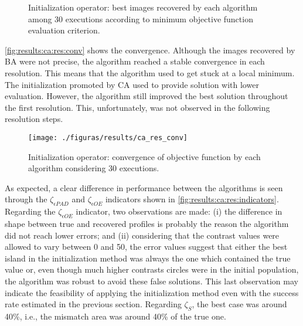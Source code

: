 			\begin{figure}
				\centering
				\caption[Initialization operator: best images recovered by each algorithm.]{Initialization operator: best images recovered by each algorithm among 30 executions according to minimum objective function evaluation criterion.}
				\label{fig:results:ca:res:images}
			\end{figure}
		
			\autoref{fig:results:ca:res:conv} shows the convergence. Although the images recovered by BA were not precise, the algorithm reached a stable convergence in each resolution. This means that the algorithm used to get stuck at a local minimum. The initialization promoted by CA used to provide solution with lower evaluation. However, the algorithm still improved the best solution throughout the first resolution. This, unfortunately, was not observed in the following resolution steps.
		
			\begin{figure}
				\centering
				\texttt{[image: ./figuras/results/ca\_res\_conv]}
				\caption[Initialization operator: convergence.]{Initialization operator: convergence of objective function by each algorithm considering 30 executions.}
				\label{fig:results:ca:res:conv}
			\end{figure}
		
			As expected, a clear difference in performance between the algorithms is seen through the $\zeta_{\epsilon PAD}$ and $\zeta_{\epsilon OE}$ indicators shown in \autoref{fig:results:ca:res:indicators}. Regarding the $\zeta_{\epsilon OE}$ indicator, two observations are made: (i) the difference in shape between true and recovered profiles is probably the reason the algorithm did not reach lower errors; and (ii) considering that the contrast values were allowed to vary between 0 and 50, the error values suggest that either the best island in the initialization method was always the one which contained the true value or, even though much higher contrasts circles were in the initial population, the algorithm was robust to avoid these false solutions. This last observation may indicate the feasibility of applying the initialization method even with the success rate estimated in the previous section. Regarding $\zeta_{S}$, the best case was around 40\%, i.e., the mismatch area was around 40\% of the true one.
		

